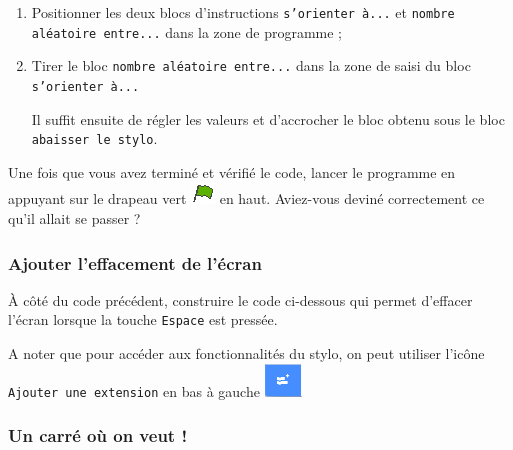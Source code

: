 \begin{enumerate}
\item Positionner les deux blocs d'instructions \texttt{s'orienter à...} et \texttt{nombre aléatoire entre...} dans la zone de programme ;


\item Tirer le bloc \texttt{nombre aléatoire entre...} dans la zone de saisi du bloc \texttt{s'orienter à...}


Il suffit ensuite de régler les valeurs et d'accrocher le bloc obtenu sous le bloc \texttt{abaisser le stylo}.
\end{enumerate}



Une fois que vous avez terminé et vérifié le code, lancer le programme en appuyant sur le drapeau vert \includegraphics[width=.7cm]{./images/scratch/DrapeauVert} en haut. Aviez-vous deviné correctement ce qu'il allait se passer ?




\subsubsection{Ajouter l'effacement de l'écran}

À côté du code précédent, construire le code ci-dessous qui permet d'effacer l'écran lorsque la touche \texttt{Espace} est pressée.


A noter que pour accéder aux fonctionnalités du stylo, on peut utiliser l'icône \texttt{Ajouter une extension} en bas à gauche \includegraphics[width=1cm]{./images/scratch/ajouterStylo.png}






\subsubsection{Un carré où on veut !}

